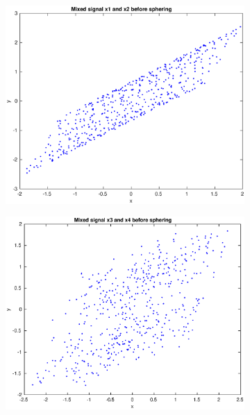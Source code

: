 \documentclass[10pt]{article}
\begin{document}
\begin{figure}[H]
  \centering
  \caption{The mixed signals before and after whitening.}
	\begin{subfigure}[b]{.49\textwidth}
		\includegraphics[width=\columnwidth]{Ass1a.eps}
		\caption{}
		\label{fig1a}
	\end{subfigure}  
	\begin{subfigure}[b]{.49\textwidth}
		\includegraphics[width=\columnwidth]{Ass1b.eps}
		\caption{}
		\label{fig1b}
	\end{subfigure}
		\begin{subfigure}[b]{.49\textwidth}

\end{subfigure}
\end{figure}
\end{document}
